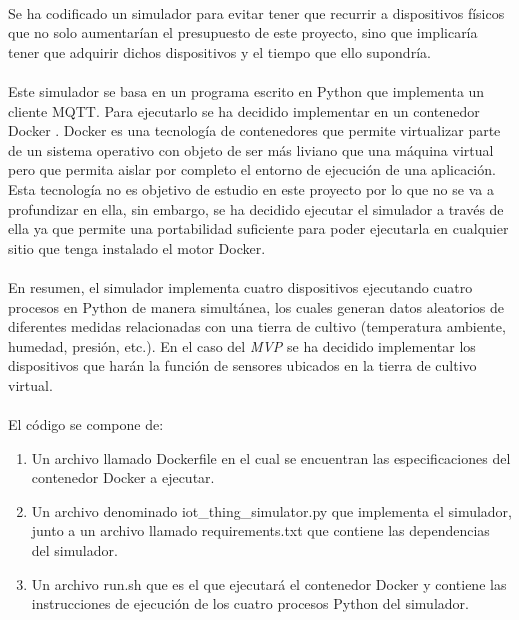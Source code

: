 \documentclass[../../memoria.tex]{subfiles}
\begin{document}
\paragraph{}
Se ha codificado un simulador para evitar tener que recurrir a dispositivos físicos que no solo aumentarían el presupuesto de este proyecto, sino que implicaría tener que adquirir dichos dispositivos y el tiempo que ello supondría.

\paragraph{}
Este simulador se basa en un programa escrito en Python que implementa un cliente MQTT. Para ejecutarlo se ha decidido implementar en un contenedor Docker \cite{docker}. Docker es una tecnología de contenedores que permite virtualizar parte de un sistema operativo con objeto de ser más liviano que una máquina virtual pero que permita aislar por completo el entorno de ejecución de una aplicación. Esta tecnología no es objetivo de estudio en este proyecto por lo que no se va a profundizar en ella, sin embargo, se ha decidido ejecutar el simulador a través de ella ya que permite una portabilidad suficiente para poder ejecutarla en cualquier sitio que tenga instalado el motor Docker.

\paragraph{}
En resumen, el simulador implementa cuatro dispositivos ejecutando cuatro procesos en Python de manera simultánea, los cuales generan datos aleatorios de diferentes medidas relacionadas con una tierra de cultivo (temperatura ambiente, humedad, presión, etc.). En el caso del \textit{MVP} se ha decidido implementar los dispositivos que harán la función de sensores ubicados en la tierra de cultivo virtual.

\paragraph{}
El código se compone de:

\begin{enumerate}
    \item Un archivo llamado Dockerfile en el cual se encuentran las especificaciones del contenedor Docker a ejecutar.

    \item Un archivo denominado iot\_thing\_simulator.py que implementa el simulador, junto a un archivo llamado requirements.txt que contiene las dependencias del simulador.

    \item Un archivo run.sh que es el que ejecutará el contenedor Docker y contiene las instrucciones de ejecución de los cuatro procesos Python del simulador.
\end{enumerate}
\end{document}
